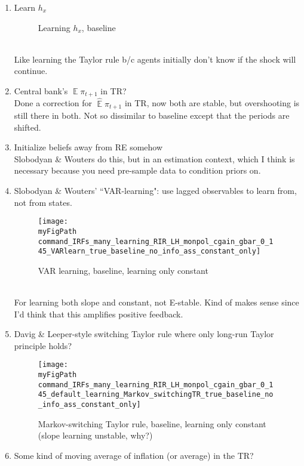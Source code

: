 \documentclass[11pt]{article}
\def \myFigPath {../figures/}
\renewcommand{\[}{\begin{equation}}
\renewcommand{\]}{\end{equation}}
\DeclareMathOperator{\E}{\mathbb{E}}
\def\mySmallerFigScale{0.18}
\def\myAdjustableFigScale{0.14}
\begin{document}
\begin{enumerate}
\item Learn $h_x$
\begin{figure}[h!]
\caption{Learning $h_x$, baseline}
\end{figure} \\
Like learning the Taylor rule b/c agents initially don't know if the shock will continue.
\item Central bank's $\E\pi_{t+1}$ in TR? \\
Done a correction for $\hat{\E}\pi_{t+1}$ in TR, now both are stable, but overshooting is still there in both. Not so dissimilar to baseline except that the periods are shifted.

\item Initialize beliefs away from RE somehow\\
Slobodyan \& Wouters do this, but in an estimation context, which I think is necessary because you need pre-sample data to condition priors on.
\item Slobodyan \& Wouters' ``VAR-learning": use lagged observables to learn from, not from states.  \\
\begin{figure}[h!]
\texttt{[image: \\myFigPath command\_IRFs\_many\_learning\_RIR\_LH\_monpol\_cgain\_gbar\_0\_145\_VARlearn\_true\_baseline\_no\_info\_ass\_constant\_only]}
\caption{ VAR learning, baseline, learning only constant}
\end{figure} \\
For learning both slope and constant, not E-stable. Kind of makes sense since I'd think that this amplifies positive feedback.
\item Davig \& Leeper-style switching Taylor rule where only long-run Taylor principle holds?
\begin{figure}[h!]
\texttt{[image: \\myFigPath command\_IRFs\_many\_learning\_RIR\_LH\_monpol\_cgain\_gbar\_0\_145\_default\_learning\_Markov\_switchingTR\_true\_baseline\_no\_info\_ass\_constant\_only]}
\caption{ Markov-switching Taylor rule, baseline, learning only constant (slope learning unstable, why?)}
\end{figure}
\item Some kind of moving average of inflation (or average) in the TR?
\end{enumerate}
\end{document}
